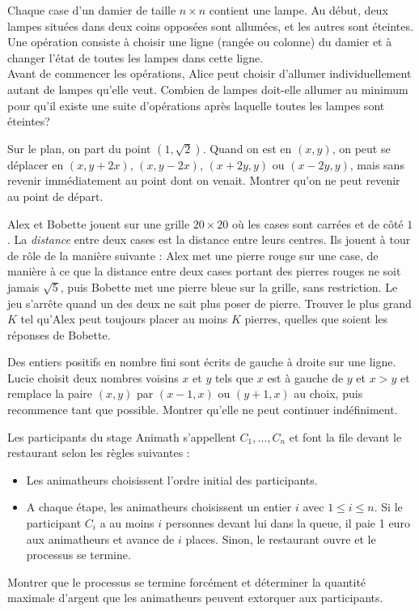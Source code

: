 \begin{exo}
Chaque case d'un damier de taille $n\times n$ contient une lampe. Au début, deux lampes situées dans deux coins opposées sont allumées, et les autres sont éteintes. Une opération consiste à choisir une ligne (rangée ou colonne) du damier et à changer l'état de toutes les lampes dans cette ligne.\\
Avant de commencer les opérations, Alice peut choisir d'allumer individuellement autant de lampes qu'elle veut. Combien de lampes doit-elle allumer au minimum pour qu'il existe une suite d'opérations après laquelle toutes les lampes sont éteintes?
\end{exo}

\begin{exo}
Sur le plan, on part du point $(1,\sqrt2)$. Quand on est en $(x,y)$, on peut se déplacer en $(x,y+2x)$, $(x,y-2x)$, $(x+2y,y)$ ou $(x-2y,y)$, mais sans revenir immédiatement au point dont on venait. Montrer qu'on ne peut revenir au point de départ.
\end{exo}

\begin{exo}
Alex et Bobette jouent sur une grille $20\times20$ où les cases sont carrées et de côté $1$. La \emph{distance} entre deux cases est la distance entre leurs centres. Ils jouent à tour de rôle de la manière suivante : Alex met une pierre rouge sur une case, de manière à ce que la distance entre deux cases portant des pierres rouges ne soit jamais $\sqrt5$, puis Bobette met une pierre bleue sur la grille, sans restriction. Le jeu s'arrête quand un des deux ne sait plus poser de pierre. Trouver le plus grand $K$ tel qu'Alex peut toujours placer au moins $K$ pierres, quelles que soient les réponses de Bobette.
\end{exo}

\begin{exo}
Des entiers positifs en nombre fini sont écrits de gauche à droite sur une ligne. Lucie choisit deux nombres voisins $x$ et $y$ tels que $x$ est à gauche de $y$ et $x>y$ et remplace la paire $(x,y)$ par $(x-1,x)$ ou $(y+1,x)$ au choix, puis recommence tant que possible. Montrer qu'elle ne peut continuer indéfiniment.
\end{exo}

\begin{exo}
Les participants du stage Animath s'appellent $C_1,\ldots,C_n$ et font la file devant le restaurant selon les règles suivantes :
\begin{itemize}
\item
Les animatheurs choisissent l'ordre initial des participants.
\item
A chaque étape, les animatheurs choisissent un entier $i$ avec $1\leq i\leq n$. Si le participant $C_i$ a au moins $i$ personnes devant lui dans la queue, il paie 1 euro aux animatheurs et avance de $i$ places. Sinon, le restaurant ouvre et le processus se termine.
\end{itemize}
Montrer que le processus se termine forcément et déterminer la quantité maximale d'argent que les animatheurs peuvent extorquer aux participants.
\end{exo}

